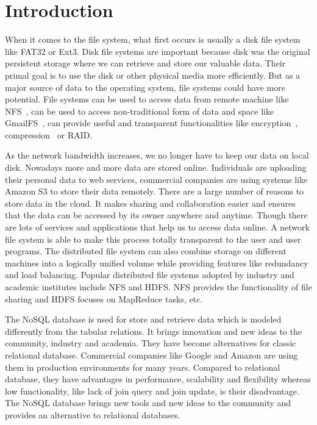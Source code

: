\chapter{Introduction}
\label{chap:intro}

    When it comes to the file system, what first occurs is usually a disk file system like FAT32 or Ext3. Disk file systems are important because disk was the original persistent storage where we can retrieve and store our valuable data. Their primal goal is to use the disk or other physical media more efficiently. But as a major source of data to the operating system, file systems could have more potential. File systems can be used to access data from remote machine like NFS~\cite{nfs}, can be used to access non-traditional form of data and space like GmailFS~\cite{gmailfs, gmailfs2}, can provide useful and transparent functionalities like encryption~\cite{encrypt}, compression~\cite{compression} or RAID.

    As the network bandwidth increases, we no longer have to keep our data on local disk. Nowadays more and more data are stored online. Individuals are uploading their personal data to web services, commercial companies are using systems like Amazon S3 to store their data remotely. There are a large number of reasons to store data in the cloud. It makes sharing and collaboration easier and ensures that the data can be accessed by its owner anywhere and anytime. Though there are lots of services and applications that help us to access data online. A network file system is able to make this process totally transparent to the user and user programs. The distributed file system can also combine storage on different machines into a logically unified volume while providing features like redundancy and load balancing. Popular distributed file systems adopted by industry and academic institutes include NFS and HDFS. NFS provides the functionality of file sharing and HDFS focuses on MapReduce tasks, etc.

    The NoSQL database is used for store and retrieve data which is modeled differently from the tabular relations. It brings innovation and new ideas to the community, industry and academia. They have become alternatives for classic relational database. Commercial companies like Google and Amazon are using them in production environments for many years. Compared to relational database, they have advantages in performance, scalability and flexibility whereas low functionality, like lack of join query and join update, is their disadvantage. The NoSQL database brings new tools and new ideas to the community and provides an alternative to relational databases. 

